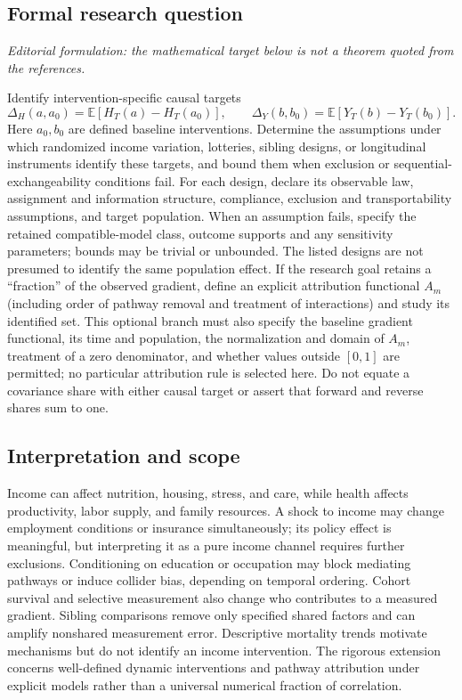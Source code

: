 \documentclass[11pt,a4paper]{article}
\begin{document}
\subsection*{Formal research question}
\emph{Editorial formulation: the mathematical target below is not a theorem quoted from the references.}

Identify intervention-specific causal targets
\[
 \Delta_H(a,a_0)=\mathbb E[H_T(a)-H_T(a_0)],\qquad
 \Delta_Y(b,b_0)=\mathbb E[Y_T(b)-Y_T(b_0)].
\]
Here $a_0,b_0$ are defined baseline interventions. Determine the assumptions under which randomized income variation, lotteries, sibling designs, or longitudinal instruments identify these targets, and bound them when exclusion or sequential-exchangeability conditions fail. For each design, declare its observable law, assignment and information structure, compliance, exclusion and transportability assumptions, and target population. When an assumption fails, specify the retained compatible-model class, outcome supports and any sensitivity parameters; bounds may be trivial or unbounded. The listed designs are not presumed to identify the same population effect. If the research goal retains a “fraction” of the observed gradient, define an explicit attribution functional $A_m$ (including order of pathway removal and treatment of interactions) and study its identified set. This optional branch must also specify the baseline gradient functional, its time and population, the normalization and domain of $A_m$, treatment of a zero denominator, and whether values outside $[0,1]$ are permitted; no particular attribution rule is selected here. Do not equate a covariance share with either causal target or assert that forward and reverse shares sum to one.

\subsection*{Interpretation and scope}
Income can affect nutrition, housing, stress, and care, while health affects productivity, labor supply, and family resources. A shock to income may change employment conditions or insurance simultaneously; its policy effect is meaningful, but interpreting it as a pure income channel requires further exclusions. Conditioning on education or occupation may block mediating pathways or induce collider bias, depending on temporal ordering. Cohort survival and selective measurement also change who contributes to a measured gradient. Sibling comparisons remove only specified shared factors and can amplify nonshared measurement error. Descriptive mortality trends motivate mechanisms but do not identify an income intervention. The rigorous extension concerns well-defined dynamic interventions and pathway attribution under explicit models rather than a universal numerical fraction of correlation.
\end{document}
